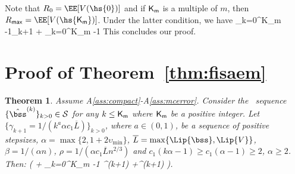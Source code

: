 \documentclass[11pt]{article}
\makeatletter
\newtheorem*{Theorem*}{Theorem}
\renewenvironment{proof}[1][\proofname]{%
   \par\pushQED{\qed}\normalfont%
   \topsep6\p@\@plus6\p@\relax
   \trivlist\item[\hskip\labelsep\bfseries#1]%
   \ignorespaces
}{%
   \popQED\endtrivlist\@endpefalse
}
\theoremstyle{t}
\makeatother
\begin{document}
\begin{proof}
Note that $R_0 = \EE[ V( \hs{0} ) ]$ and if ${\sf K}_{\sf m }$ is a multiple of $m$, then $R_{\sf max} = \EE[ V( \hs{{\sf K}_{\sf m }}) ]$. Under the latter condition, we have
\beq\notag
 \sum_{k=0}^{{\sf K}_{\sf m }-1}\gamma_{k+1} \EE[ \| \grd V( \hs{k} ) \|^2 ] \leq {}\EE[ V( \hs{0} ) - V( \hs{{\sf K}_{\sf m }}) ] +  \sum_{k=0}^{{\sf K}_{\sf m }-1} 
\eeq
This concludes our proof.

\end{proof}

\clearpage

\section{Proof of Theorem~\ref{thm:fisaem}}\label{app:theoremfisaem}
\begin{Theorem*}
Assume A\ref{ass:compact}-A\ref{ass:mcerror}.
Consider the \FISAEM\ sequence $\{\hat{\bss}^{(k)}\}_{k>0} \in \mathcal{S}$ for any $k \leq {\sf K}_{\sf m }$ where ${\sf K}_{\sf m }$ be a positive integer.
Let $\{\gamma_{k+1} = 1/(k^a \alpha c_1 \overline{L}) \}_{k>0}$, where $a \in (0,1)$, be a sequence of positive stepsizes, $\alpha =\max\{2, 1+2\upsilon_{\min}\}$, $\overline{L} = \max\{ \Lip{\bss} , \Lip{V} \}$, $\beta = 1/(\alpha n)$, $\rho = 1/(\alpha c_1 \overline{L}n^{2/3})$ and $c_1(k\alpha-1) \geq c_1(\alpha-1) \geq 2$, $\alpha \geq 2$. Then:
\beq\notag
 \EE[ \| \grd V( \hs{K} ) \|^2 ] \leq {} \left( \EE {}   + \sum_{k=0}^{{\sf K}_{\sf m }-1}  \Xi^{(k+1)}  +\Gamma^{(k+1)} \EE [\| \hs{k} - \tilde{S}^{(k)}\|^2 ]\right)\eqs.
\eeq
\end{Theorem*} 
\end{document}
